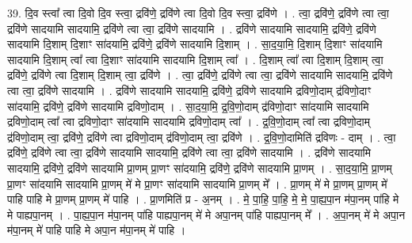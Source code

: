 \documentclass[17pt]{extarticle}
\begin{document}
39. दि॒व स्त्वा᳚ त्वा दि॒वो दि॒व स्त्वा॒ द्रवि॑णे॒ द्रवि॑णे त्वा दि॒वो दि॒व स्त्वा॒ द्रवि॑णे । . त्वा॒ द्रवि॑णे॒ द्रवि॑णे त्वा त्वा॒ द्रवि॑णे सादयामि सादयामि॒ द्रवि॑णे त्वा त्वा॒ द्रवि॑णे सादयामि । . द्रवि॑णे सादयामि सादयामि॒ द्रवि॑णे॒ द्रवि॑णे सादयामि दि॒शाम् दि॒शाꣳ सा॑दयामि॒ द्रवि॑णे॒ द्रवि॑णे सादयामि दि॒शाम् । . सा॒द॒या॒मि॒ दि॒शाम् दि॒शाꣳ सा॑दयामि सादयामि दि॒शाम् त्वा᳚ त्वा दि॒शाꣳ सा॑दयामि सादयामि दि॒शाम् त्वा᳚ । . दि॒शाम् त्वा᳚ त्वा दि॒शाम् दि॒शाम् त्वा॒ द्रवि॑णे॒ द्रवि॑णे त्वा दि॒शाम् दि॒शाम् त्वा॒ द्रवि॑णे । . त्वा॒ द्रवि॑णे॒ द्रवि॑णे त्वा त्वा॒ द्रवि॑णे सादयामि सादयामि॒ द्रवि॑णे त्वा त्वा॒ द्रवि॑णे सादयामि । . द्रवि॑णे सादयामि सादयामि॒ द्रवि॑णे॒ द्रवि॑णे सादयामि द्रविणो॒दाम् द्र॑विणो॒दाꣳ सा॑दयामि॒ द्रवि॑णे॒ द्रवि॑णे सादयामि द्रविणो॒दाम् । . सा॒द॒या॒मि॒ द्र॒वि॒णो॒दाम् द्र॑विणो॒दाꣳ सा॑दयामि सादयामि द्रविणो॒दाम् त्वा᳚ त्वा द्रविणो॒दाꣳ सा॑दयामि सादयामि द्रविणो॒दाम् त्वा᳚ । . द्र॒वि॒णो॒दाम् त्वा᳚ त्वा द्रविणो॒दाम् द्र॑विणो॒दाम् त्वा॒ द्रवि॑णे॒ द्रवि॑णे त्वा द्रविणो॒दाम् द्र॑विणो॒दाम् त्वा॒ द्रवि॑णे । . द्र॒वि॒णो॒दामिति॑ द्रविणः - दाम् । . त्वा॒ द्रवि॑णे॒ द्रवि॑णे त्वा त्वा॒ द्रवि॑णे सादयामि सादयामि॒ द्रवि॑णे त्वा त्वा॒ द्रवि॑णे सादयामि । . द्रवि॑णे सादयामि सादयामि॒ द्रवि॑णे॒ द्रवि॑णे सादयामि प्रा॒णम् प्रा॒णꣳ सा॑दयामि॒ द्रवि॑णे॒ द्रवि॑णे सादयामि प्रा॒णम् । . सा॒द॒या॒मि॒ प्रा॒णम् प्रा॒णꣳ सा॑दयामि सादयामि प्रा॒णम् मे॑ मे प्रा॒णꣳ सा॑दयामि सादयामि प्रा॒णम् मे᳚ । . प्रा॒णम् मे॑ मे प्रा॒णम् प्रा॒णम् मे॑ पाहि पाहि मे प्रा॒णम् प्रा॒णम् मे॑ पाहि । . प्रा॒णमिति॑ प्र - अ॒नम् । . मे॒ पा॒हि॒ पा॒हि॒ मे॒ मे॒ पा॒ह्य॒पा॒न म॑पा॒नम् पा॑हि मे मे पाह्यपा॒नम् । . पा॒ह्य॒पा॒न म॑पा॒नम् पा॑हि पाह्यपा॒नम् मे॑ मे अपा॒नम् पा॑हि पाह्यपा॒नम् मे᳚ । . अ॒पा॒नम् मे॑ मे अपा॒न म॑पा॒नम् मे॑ पाहि पाहि मे अपा॒न म॑पा॒नम् मे॑ पाहि । \newline
\end{document}
